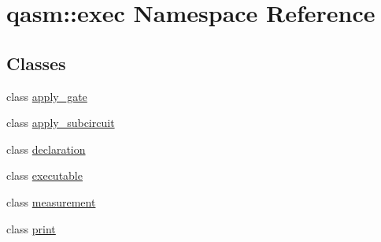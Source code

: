 \hypertarget{namespaceqasm_1_1exec}{}\section{qasm\+:\+:exec Namespace Reference}
\label{namespaceqasm_1_1exec}
\subsection*{Classes}
\begin{DoxyCompactItemize}
\item 
class \hyperlink{classqasm_1_1exec_1_1apply__gate}{apply\+\_\+gate}
\item 
class \hyperlink{classqasm_1_1exec_1_1apply__subcircuit}{apply\+\_\+subcircuit}
\item 
class \hyperlink{classqasm_1_1exec_1_1declaration}{declaration}
\item 
class \hyperlink{classqasm_1_1exec_1_1executable}{executable}
\item 
class \hyperlink{classqasm_1_1exec_1_1measurement}{measurement}
\item 
class \hyperlink{classqasm_1_1exec_1_1print}{print}
\end{DoxyCompactItemize}
